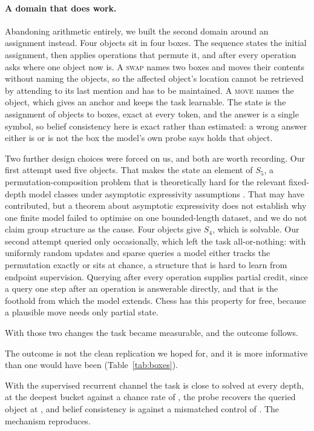\paragraph{A domain that does work.}
Abandoning arithmetic entirely, we built the second domain around an assignment
instead. Four objects sit in four boxes. The sequence states the initial
assignment, then applies operations that permute it, and after every operation
asks where one object now is. A \textsc{swap} names two boxes and moves their
contents without naming the objects, so the affected object's location cannot be
retrieved by attending to its last mention and has to be maintained. A
\textsc{move} names the object, which gives an anchor and keeps the task
learnable. The state is the assignment of objects to boxes, exact at every
token, and the answer is a single symbol, so belief consistency here is exact
rather than estimated: a wrong answer either is or is not the box the model's own
probe says holds that object.

Two further design choices were forced on us, and both are worth recording. Our
first attempt used five objects. That makes the state an element of $S_5$, a
permutation-composition problem that is theoretically hard for the relevant
fixed-depth model classes under asymptotic expressivity assumptions
\citep{merrill2024illusion}. That may have contributed, but a theorem about
asymptotic expressivity does not establish why one finite model failed to
optimise on one bounded-length dataset, and we do not claim group structure as
the cause. Four objects give $S_4$,
which is solvable. Our second attempt queried only occasionally, which left the
task all-or-nothing: with uniformly random updates and sparse queries a model
either tracks the permutation exactly or sits at chance, a structure that is hard
to learn from endpoint supervision. Querying after every operation supplies
partial credit, since a query one step after an operation is answerable directly,
and that is the foothold from which the model extends. Chess has this property
for free, because a plausible move needs only partial state.

With those two changes the task became measurable, and the outcome follows.

The outcome is not the clean replication we hoped for, and it is more
informative than one would have been (Table~\ref{tab:boxes}).

With the supervised recurrent channel the task is close to solved at every depth,
 at the deepest bucket against a chance rate of
, the probe recovers the queried object at
, and belief consistency is 
against a mismatched control of . The mechanism
reproduces.

